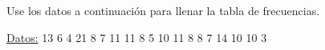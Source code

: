\documentclass{cdplf-prueba}
\begin{document}
\subsection{}

Use los datos a continuación para llenar la tabla de frecuencias.

\underline{Datos:} \hspace{4pt} 13 \hspace{4pt}\textbullet\hspace{4pt} 6 \hspace{4pt}\textbullet\hspace{4pt} 4 \hspace{4pt}\textbullet\hspace{4pt} 21 \hspace{4pt}\textbullet\hspace{4pt} 8 \hspace{4pt}\textbullet\hspace{4pt} 7 \hspace{4pt}\textbullet\hspace{4pt} 11 \hspace{4pt}\textbullet\hspace{4pt} 11 \hspace{4pt}\textbullet\hspace{4pt} 8 \hspace{4pt}\textbullet\hspace{4pt} 5 \hspace{4pt}\textbullet\hspace{4pt} 10 \hspace{4pt}\textbullet\hspace{4pt} 11 \hspace{4pt}\textbullet\hspace{4pt} 8 \hspace{4pt}\textbullet\hspace{4pt} 8 \hspace{4pt}\textbullet\hspace{4pt} 7 \hspace{4pt}\textbullet\hspace{4pt} 14 \hspace{4pt}\textbullet\hspace{4pt} 10 \hspace{4pt}\textbullet\hspace{4pt} 10 \hspace{4pt}\textbullet\hspace{4pt} 3
\end{document}
